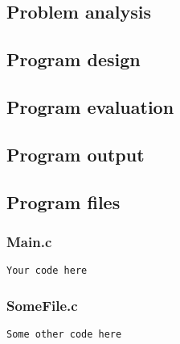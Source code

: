 \documentclass{article}
\begin{document}
\subsection*{Problem analysis}


\subsection*{Program design}


\subsection*{Program evaluation}


\subsection*{Program output}


\subsection*{Program files}
\subsubsection*{Main.c}
\begin{lstlisting}
Your code here
\end{lstlisting}

\subsubsection*{SomeFile.c}
\begin{lstlisting}
Some other code here
\end{lstlisting}
\end{document}

